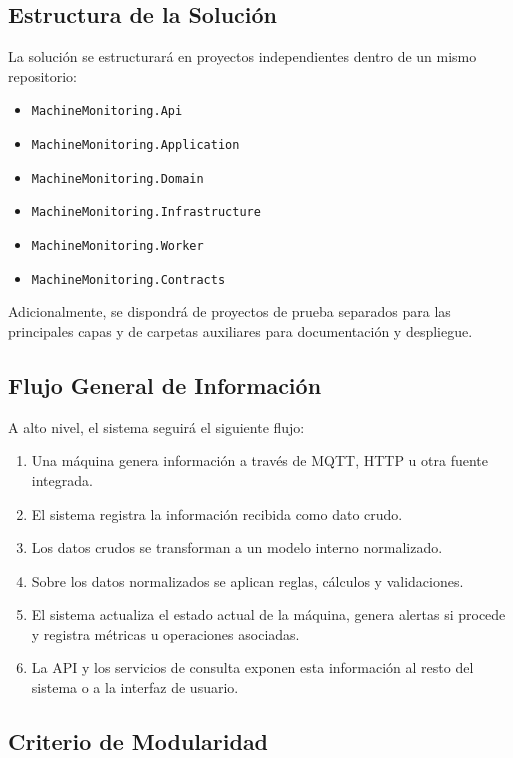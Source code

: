 \subsection{Estructura de la Solución}

La solución se estructurará en proyectos independientes dentro de un mismo repositorio:

\begin{itemize}
    \item \texttt{MachineMonitoring.Api}
    \item \texttt{MachineMonitoring.Application}
    \item \texttt{MachineMonitoring.Domain}
    \item \texttt{MachineMonitoring.Infrastructure}
    \item \texttt{MachineMonitoring.Worker}
    \item \texttt{MachineMonitoring.Contracts}
\end{itemize}

Adicionalmente, se dispondrá de proyectos de prueba separados para las principales capas y de carpetas auxiliares para documentación y despliegue.

\subsection{Flujo General de Información}

A alto nivel, el sistema seguirá el siguiente flujo:

\begin{enumerate}
    \item Una máquina genera información a través de MQTT, HTTP u otra fuente integrada.
    \item El sistema registra la información recibida como dato crudo.
    \item Los datos crudos se transforman a un modelo interno normalizado.
    \item Sobre los datos normalizados se aplican reglas, cálculos y validaciones.
    \item El sistema actualiza el estado actual de la máquina, genera alertas si procede y registra métricas u operaciones asociadas.
    \item La API y los servicios de consulta exponen esta información al resto del sistema o a la interfaz de usuario.
\end{enumerate}

\subsection{Criterio de Modularidad}

